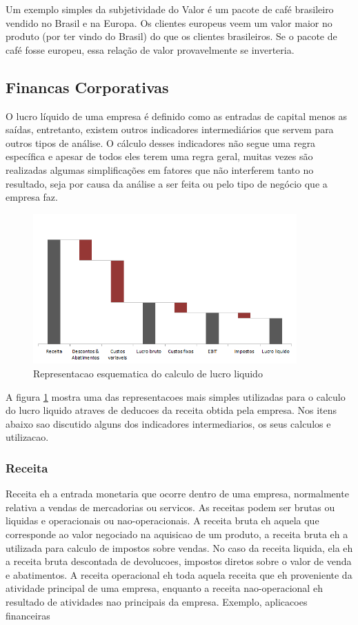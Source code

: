 \documentclass[12pt]{article}
\begin{document}
Um exemplo simples da subjetividade do Valor é um pacote de café brasileiro vendido no Brasil e na Europa. Os clientes europeus veem um valor maior no produto (por ter vindo do Brasil) do que os clientes brasileiros. Se o pacote de café fosse europeu, essa relação de valor provavelmente se inverteria.

\subsection{Financas Corporativas}
O lucro líquido de uma empresa é definido como as entradas de capital menos as saídas, entretanto, existem outros indicadores intermediários que servem para outros tipos de análise. O cálculo desses indicadores não segue uma regra específica e apesar de todos eles terem uma regra geral, muitas vezes são realizadas algumas simplificações em fatores que não interferem tanto no resultado, seja por causa da análise a ser feita ou pelo tipo de negócio que a empresa faz. 


\begin{figure}[h!]
	\centering
	\includegraphics[width=0.9\textwidth]{img/finance.png}
	\caption{Representacao esquematica do calculo de lucro liquido}
	\label{fig:lucro}
\end{figure}

A figura \ref{fig:lucro} mostra uma das representacoes mais simples utilizadas para o calculo do lucro liquido atraves de deducoes da receita obtida pela empresa. Nos itens abaixo sao discutido alguns dos indicadores intermediarios, os seus calculos e utilizacao. 

\subsubsection{Receita}
Receita eh a entrada monetaria que ocorre dentro de uma empresa, normalmente relativa a vendas de mercadorias ou servicos. As receitas podem ser brutas ou liquidas e operacionais ou nao-operacionais. A receita bruta eh aquela que corresponde ao valor negociado na aquisicao de um produto, a receita bruta eh a utilizada para calculo de impostos sobre vendas. No caso da receita liquida, ela eh a receita bruta descontada de devolucoes, impostos diretos sobre o valor de venda e abatimentos.
A receita operacional eh toda aquela receita que eh proveniente da atividade principal de uma empresa, enquanto a receita nao-operacional eh resultado de atividades nao principais da empresa. Exemplo, aplicacoes financeiras
\end{document}
